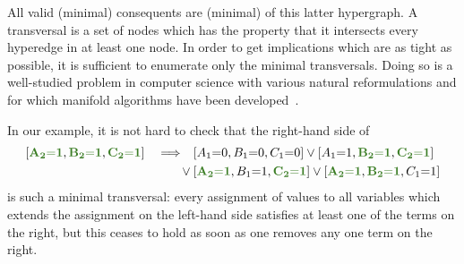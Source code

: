 All valid (minimal) consequents are (minimal)  of this latter hypergraph. A transversal is a set of nodes which has the property that it intersects every hyperedge in at least one node. In order to get implications which are as tight as possible, it is sufficient to enumerate only the minimal transversals. Doing so is a well-studied problem in computer science with various natural reformulations and for which manifold algorithms have been developed~\cite{eiter_dualization_2008}.


In our example, it is not hard to check that the right-hand side of
\begin{align}\begin{split}\label{eq:F3implicationform}
	\bracks{\mgreen{A_2 \eql 1}, \mgreen{B_2 \eql 1}, \mgreen{C_2 \eql 1}} \quad\Longrightarrow\quad &\bracks{A_1 \eql 0, B_1 \eql 0, C_1 \eql 0} \lor \bracks{A_1 \eql 1, \mgreen{B_2 \eql 1}, \mgreen{C_2 \eql 1}} \\
	\lor\: & \bracks{\mgreen{A_2 \eql 1}, B_1 \eql 1, \mgreen{C_2 \eql 1}} \lor \bracks{\mgreen{A_2 \eql 1}, \mgreen{B_2 \eql 1}, C_1 \eql 1}
\end{split}\end{align}
is such a minimal transversal: every assignment of values to all variables which extends the assignment on the left-hand side satisfies at least one of the terms on the right, but this ceases to hold as soon as one removes any one term on the right. 

